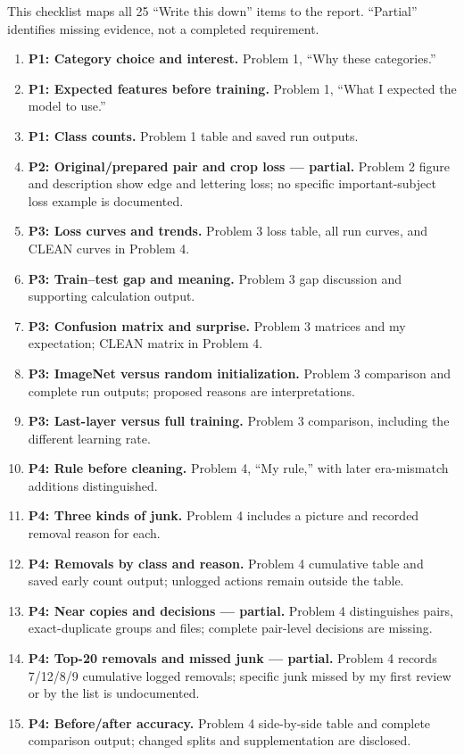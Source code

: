 This checklist maps all 25 ``Write this down'' items to the report. ``Partial'' identifies missing evidence, not a completed requirement.
\begin{enumerate}
\item \textbf{P1: Category choice and interest.} Problem 1, ``Why these categories.''
\item \textbf{P1: Expected features before training.} Problem 1, ``What I expected the model to use.''
\item \textbf{P1: Class counts.} Problem 1 table and saved run outputs.
\item \textbf{P2: Original/prepared pair and crop loss --- partial.} Problem 2 figure and description show edge and lettering loss; no specific important-subject loss example is documented.
\item \textbf{P3: Loss curves and trends.} Problem 3 loss table, all run curves, and CLEAN curves in Problem 4.
\item \textbf{P3: Train--test gap and meaning.} Problem 3 gap discussion and supporting calculation output.
\item \textbf{P3: Confusion matrix and surprise.} Problem 3 matrices and my expectation; CLEAN matrix in Problem 4.
\item \textbf{P3: ImageNet versus random initialization.} Problem 3 comparison and complete run outputs; proposed reasons are interpretations.
\item \textbf{P3: Last-layer versus full training.} Problem 3 comparison, including the different learning rate.
\item \textbf{P4: Rule before cleaning.} Problem 4, ``My rule,'' with later era-mismatch additions distinguished.
\item \textbf{P4: Three kinds of junk.} Problem 4 includes a picture and recorded removal reason for each.
\item \textbf{P4: Removals by class and reason.} Problem 4 cumulative table and saved early count output; unlogged actions remain outside the table.
\item \textbf{P4: Near copies and decisions --- partial.} Problem 4 distinguishes pairs, exact-duplicate groups and files; complete pair-level decisions are missing.
\item \textbf{P4: Top-20 removals and missed junk --- partial.} Problem 4 records 7/12/8/9 cumulative logged removals; specific junk missed by my first review or by the list is undocumented.
\item \textbf{P4: Before/after accuracy.} Problem 4 side-by-side table and complete comparison output; changed splits and supplementation are disclosed.

\end{enumerate}

